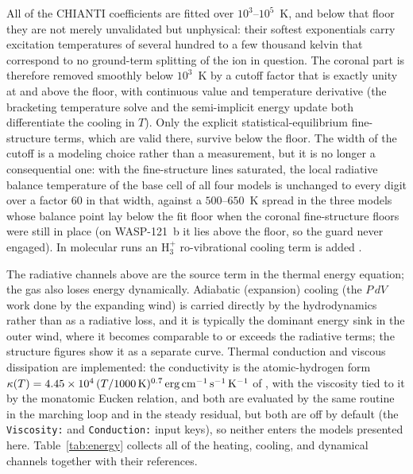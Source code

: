 \documentclass[twocolumn]{aastex702}
\begin{document}
All of the CHIANTI coefficients are fitted over $10^3$--$10^5$~K, and below that floor they
are not merely unvalidated but unphysical: their softest exponentials carry excitation
temperatures of several hundred to a few thousand kelvin that correspond to no ground-term
splitting of the ion in question. The coronal part is therefore removed smoothly below
$10^3$~K by a cutoff factor that is exactly unity at and above the floor, with continuous
value and temperature derivative (the bracketing temperature solve and the semi-implicit
energy update both differentiate the cooling in $T$). Only the explicit
statistical-equilibrium fine-structure terms, which are valid there, survive below the
floor. The width of the cutoff is a modeling choice rather than a measurement, but it is no
longer a consequential one: with the fine-structure lines saturated, the local radiative
balance temperature of the base cell of all four models is unchanged to every digit over a
factor $60$ in that width, against a $500$--$650$~K spread in the three models whose
balance point lay below the fit floor when the coronal fine-structure floors were still in
place (on WASP-121~b it lies above the floor, so the guard never engaged). In molecular runs an $\mathrm{H_3^+}$
ro-vibrational cooling term is added \citep{Miller2013}.

The radiative channels above are the source term in the thermal energy equation; the gas
also loses energy dynamically. Adiabatic (expansion) cooling (the $P\,dV$ work done by
the expanding wind) is carried directly by the hydrodynamics rather than as a radiative
loss, and it is typically the dominant energy sink in the outer wind, where it becomes
comparable to or exceeds the radiative terms; the structure figures show it as a separate
curve. Thermal conduction and viscous dissipation are implemented: the conductivity is
the atomic-hydrogen form
$\kappa(T)=4.45\times10^{4}\,(T/1000\,{\rm K})^{0.7}\,{\rm erg\,cm^{-1}\,s^{-1}\,K^{-1}}$
of \citet{Watson1981}, with the viscosity tied to it by the monatomic Eucken relation, and
both are evaluated by the same routine in the marching loop and in the steady residual,
but both are off by default (the \texttt{Viscosity:} and \texttt{Conduction:} input keys),
so neither enters the models presented here. Table~\ref{tab:energy} collects all of the
heating, cooling, and dynamical channels together with their references.
\end{document}
